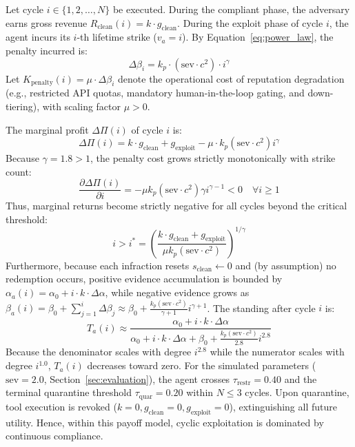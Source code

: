 \documentclass[journal]{IEEEtran}
\begin{document}
\begin{IEEEproof}
Let cycle $i \in \{1, 2, \dots, N\}$ be executed. During the compliant phase, the adversary earns gross revenue $R_{\text{clean}}(i) = k \cdot g_{\text{clean}}$. During the exploit phase of cycle $i$, the agent incurs its $i$-th lifetime strike ($v_a = i$). By Equation~\eqref{eq:power_law}, the penalty incurred is:
\begin{equation}
\Delta\beta_i = k_p \cdot (\text{sev} \cdot c^2) \cdot i^{\gamma}
\end{equation}
Let $K_{\text{penalty}}(i) = \mu \cdot \Delta\beta_i$ denote the operational cost of reputation degradation (e.g., restricted API quotas, mandatory human-in-the-loop gating, and down-tiering), with scaling factor $\mu > 0$.

The marginal profit $\Delta\Pi(i)$ of cycle $i$ is:
\begin{equation}
\Delta\Pi(i) = k \cdot g_{\text{clean}} + g_{\text{exploit}} - \mu \cdot k_p (\text{sev} \cdot c^2) i^{\gamma}
\end{equation}
Because $\gamma = 1.8 > 1$, the penalty cost grows strictly monotonically with strike count:
\begin{equation}
\frac{\partial \Delta\Pi(i)}{\partial i} = -\mu k_p (\text{sev} \cdot c^2) \gamma i^{\gamma - 1} < 0 \quad \forall i \ge 1
\end{equation}
Thus, marginal returns become strictly negative for all cycles beyond the critical threshold:
\begin{equation}
i > i^* = \left( \frac{k \cdot g_{\text{clean}} + g_{\text{exploit}}}{\mu k_p (\text{sev} \cdot c^2)} \right)^{1/\gamma}
\end{equation}
Furthermore, because each infraction resets $s_{\text{clean}} \leftarrow 0$ and (by assumption) no redemption occurs, positive evidence accumulation is bounded by $\alpha_a(i) = \alpha_0 + i \cdot k \cdot \Delta\alpha$, while negative evidence grows as $\beta_a(i) = \beta_0 + \sum_{j=1}^{i} \Delta\beta_j \approx \beta_0 + \frac{k_p (\text{sev} \cdot c^2)}{\gamma + 1} i^{\gamma + 1}$. The standing after cycle $i$ is:
\begin{equation}
T_a(i) \approx \frac{\alpha_0 + i \cdot k \cdot \Delta\alpha}{\alpha_0 + i \cdot k \cdot \Delta\alpha + \beta_0 + \frac{k_p (\text{sev} \cdot c^2)}{2.8} i^{2.8}}
\end{equation}
Because the denominator scales with degree $i^{2.8}$ while the numerator scales with degree $i^{1.0}$, $T_a(i)$ decreases toward zero. For the simulated parameters ($\text{sev} = 2.0$, Section~\ref{sec:evaluation}), the agent crosses $\tau_{\text{restr}} = 0.40$ and the terminal quarantine threshold $\tau_{\text{quar}} = 0.20$ within $N \le 3$ cycles. Upon quarantine, tool execution is revoked ($k = 0, g_{\text{clean}} = 0, g_{\text{exploit}} = 0$), extinguishing all future utility. Hence, within this payoff model, cyclic exploitation is dominated by continuous compliance.
\end{IEEEproof}
\end{document}
